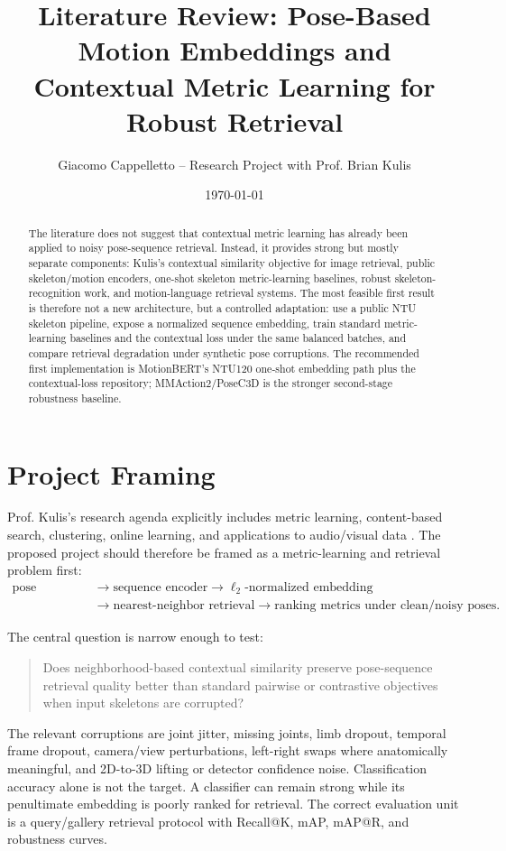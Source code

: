 \documentclass[11pt]{article}
\title{Literature Review: Pose-Based Motion Embeddings and Contextual Metric Learning for Robust Retrieval}
\author{Giacomo Cappelletto -- Research Project with Prof. Brian Kulis}
\date{\today}
\begin{document}
\maketitle

\begin{abstract}
\noindent
The literature does not suggest that contextual metric learning has already been applied to noisy pose-sequence retrieval. Instead, it provides strong but mostly separate components: Kulis's contextual similarity objective for image retrieval, public skeleton/motion encoders, one-shot skeleton metric-learning baselines, robust skeleton-recognition work, and motion-language retrieval systems. The most feasible first result is therefore not a new architecture, but a controlled adaptation: use a public NTU skeleton pipeline, expose a normalized sequence embedding, train standard metric-learning baselines and the contextual loss under the same balanced batches, and compare retrieval degradation under synthetic pose corruptions. The recommended first implementation is MotionBERT's NTU120 one-shot embedding path plus the contextual-loss repository; MMAction2/PoseC3D is the stronger second-stage robustness baseline.
\end{abstract}

\section{Project Framing}

Prof. Kulis's research agenda explicitly includes metric learning, content-based search, clustering, online learning, and applications to audio/visual data \citep{kulisProfile}. The proposed project should therefore be framed as a metric-learning and retrieval problem first:
\begin{equation}
\begin{aligned}
\text{pose sequence} &\rightarrow \text{sequence encoder}
\rightarrow \ell_2\text{-normalized embedding} \\
&\rightarrow \text{nearest-neighbor retrieval}
\rightarrow \text{ranking metrics under clean/noisy poses}.
\end{aligned}
\end{equation}

The central question is narrow enough to test:
\begin{quote}
Does neighborhood-based contextual similarity preserve pose-sequence retrieval quality better than standard pairwise or contrastive objectives when input skeletons are corrupted?
\end{quote}
The relevant corruptions are joint jitter, missing joints, limb dropout, temporal frame dropout, camera/view perturbations, left-right swaps where anatomically meaningful, and 2D-to-3D lifting or detector confidence noise. Classification accuracy alone is not the target. A classifier can remain strong while its penultimate embedding is poorly ranked for retrieval. The correct evaluation unit is a query/gallery retrieval protocol with Recall@K, mAP, mAP@R, and robustness curves.
\end{document}
